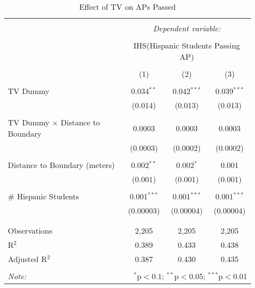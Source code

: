 
\begin{table}[!htbp] \centering 
  \caption{Effect of TV on APs Passed} 
  \label{} 
\begin{tabular}{@{\extracolsep{-2pt}}lccc} 
\\[-1.8ex]\hline 
\hline \\[-1.8ex] 
 & \multicolumn{3}{c}{\textit{Dependent variable:}} \\ 
\cline{2-4} 
\\[-1.8ex] & \multicolumn{3}{c}{IHS(Hispanic Students Passing AP)} \\ 
\\[-1.8ex] & (1) & (2) & (3)\\ 
\hline \\[-1.8ex] 
 TV Dummy & 0.034$^{**}$ & 0.042$^{***}$ & 0.039$^{***}$ \\ 
  & (0.014) & (0.013) & (0.013) \\ 
  & & & \\ 
 TV Dummy $\times$ Distance to Boundary & 0.0003 & 0.0003 & 0.0003 \\ 
  & (0.0003) & (0.0002) & (0.0002) \\ 
  & & & \\ 
 Distance to Boundary (meters) & 0.002$^{**}$ & 0.002$^{*}$ & 0.001 \\ 
  & (0.001) & (0.001) & (0.001) \\ 
  & & & \\ 
 \# Hispanic Students & 0.001$^{***}$ & 0.001$^{***}$ & 0.001$^{***}$ \\ 
  & (0.00003) & (0.00004) & (0.00004) \\ 
  & & & \\ 
\hline \\[-1.8ex] 
Observations & 2,205 & 2,205 & 2,205 \\ 
R$^{2}$ & 0.389 & 0.433 & 0.438 \\ 
Adjusted R$^{2}$ & 0.387 & 0.430 & 0.435 \\ 
\hline 
\hline \\[-1.8ex] 
\textit{Note:}  & \multicolumn{3}{r}{$^{*}$p$<$0.1; $^{**}$p$<$0.05; $^{***}$p$<$0.01} \\ 
\end{tabular} 
\end{table} 
